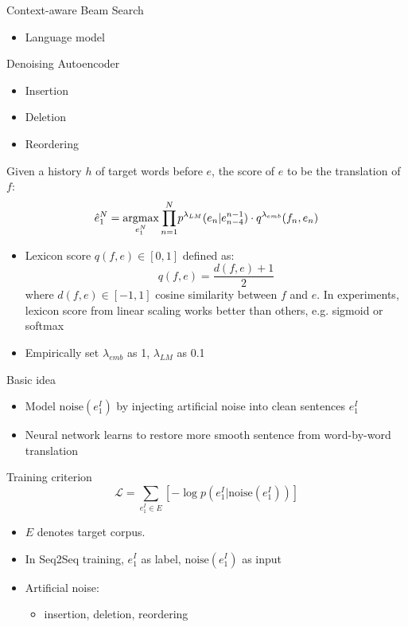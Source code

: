 \documentclass[11pt, a4paper, landscape]{article}
\newcommand*{\argmax}{\ensuremath{\operatornamewithlimits{argmax}}\xspace}
\begin{document}
	\NewPage
	\vfill
	Context-aware Beam Search
	\begin{itemize}
		\item Language model\\
	\end{itemize}
	Denoising Autoencoder
	\begin{itemize}
		\item Insertion
		\item Deletion
		\item Reordering
	\end{itemize}	
	\vfill
		
	\NewPage
	
	\vfill
	Given a history $h$ of target words before $e$, the score of $e$ to be the translation of $f$:
	\[ \hat{e}_1^N = \argmax\limits_{e_1^N}{\prod_{n=1}^{N}} {p^{\lambda_{LM}}(e_n|e_{n-4}^{n-1}) \cdot q^{\lambda_{emb}}(f_n,e_n)}\]	
	\begin{itemize}
		\item Lexicon score $q(f,e) \in [0,1] $ defined as:
		\[ q(f,e)= \frac{d(f,e)+1}{2}\]
		where $d(f,e)\in [-1,1]$ cosine similarity between $f$ and $e$. In experiments, lexicon score from linear scaling works better than others, e.g. sigmoid or softmax
		\item Empirically set ${\lambda_{emb}}$  as 1, ${\lambda_{LM}}$ as 0.1
	\end{itemize}	
	\vfill
	
\NewPage
{}	
\vfill
	Basic idea
	\begin{itemize}
		\item Model ${\text{noise}}(e_1^I)$ by injecting artificial noise into clean sentences $e_1^I$
		\item Neural network learns to restore more smooth sentence from word-by-word translation\\
	\end{itemize}
	 Training criterion
	\[ \mathcal{L} = \sum_{e_1^I \in E}[-\log p(e_1^I|\text{noise}(e_1^I))]\]
	\begin{itemize}
		\item $E$ denotes target corpus.
		\item In Seq2Seq training, $e_1^I$ as label, $\text{noise}(e_1^I)$  as input 
		\item Artificial noise:
		\begin{itemize}
			\item insertion, deletion, reordering
		\end{itemize} 
	\end{itemize}
\end{document}
